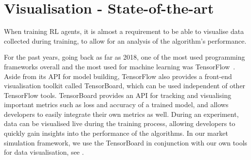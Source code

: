 
\section{Visualisation - State-of-the-art}

When training RL agents, it is almost a requirement to be able to visualise data collected during training, to allow for an analysis of the algorithm's performance.

For the past years, going back as far as 2018, one of the most used programming frameworks overall and the most used for machine learning was TensorFlow~\cite{StackOverflowSurvey}. Aside from its API for model building, TensorFlow also provides a front-end visualisation toolkit called TensorBoard, which can be used independent of other TensorFlow tools. TensorBoard provides an API for tracking and visualising important metrics such as loss and accuracy of a trained model, and allows developers to easily integrate their own metrics as well. During an experiment, data can be visualised live during the training process, allowing developers to quickly gain insights into the performance of the algorithms. In our market simulation framework, we use the TensorBoard in conjunction with our own tools for data visualisation, see .

